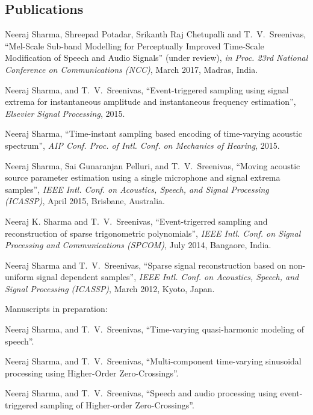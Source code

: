 \documentclass[line]{resume}
\begin{document}
{\begin{resume}
    \section{\mysidestyle Publications}
    \vspace{5mm}
    \begin{list2}
       \item Neeraj Sharma, Shreepad  Potadar, Srikanth Raj Chetupalli and  T.~V.~Sreenivas, ``Mel-Scale Sub-band Modelling for Perceptually
       Improved Time-Scale  Modification of Speech and Audio  Signals'' (under review),
	\textsl{in Proc. 23rd National Conference on Communications (NCC)}, March 2017, Madras, India.       
      \item Neeraj Sharma, and T.~V.~Sreenivas, ``Event-triggered sampling using signal extrema for instantaneous amplitude and instantaneous frequency estimation'',
	\textsl{Elsevier Signal Processing}, 2015.
      \item Neeraj Sharma, ``Time-instant sampling based encoding of time-varying acoustic spectrum'',
	\textsl{AIP Conf. Proc. of Intl. Conf. on Mechanics of Hearing}, 2015.
      \item Neeraj Sharma, Sai Gunaranjan Pelluri, and T.~V.~Sreenivas, ``Moving acoustic source parameter estimation using a single microphone
      and signal extrema samples'',
	\textsl{IEEE Intl. Conf. on Acoustics, Speech, and Signal Processing (ICASSP)}, April 2015, Brisbane, Australia.
      \item Neeraj K. Sharma and T.~V.~Sreenivas, ``Event-trigerred sampling and reconstruction of sparse trigonometric polynomials'',
	\textsl{IEEE Intl. Conf. on Signal Processing and Communications (SPCOM)}, July 2014, Bangaore, India.
      \item Neeraj Sharma and T.~V.~Sreenivas, ``Sparse signal reconstruction based on non-uniform signal dependent samples'',
	\textsl{IEEE Intl. Conf. on Acoustics, Speech, and Signal Processing (ICASSP)}, March 2012, Kyoto, Japan.
     \end{list2}
    \vspace{-1mm}
     Manuscripts in preparation:
     \begin{list2}
       \item Neeraj Sharma, and T.~V.~Sreenivas, ``Time-varying quasi-harmonic modeling of speech''.
       \item Neeraj Sharma, and T.~V.~Sreenivas, ``Multi-component time-varying sinusoidal processing using Higher-Order Zero-Crossings''.
       \item Neeraj Sharma, and T.~V.~Sreenivas, ``Speech and audio processing using event-triggered sampling of Higher-order Zero-Crossings''.
       \end{list2}
     \vspace{-1.5mm}
    \vspace{-2.5mm}

\end{resume}}
\end{document}
